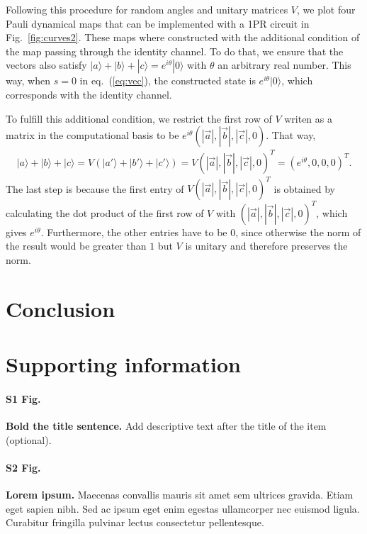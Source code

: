 \documentclass[10pt,letterpaper]{article} %
\newcommand{\fref}[1]{Fig.~\ref{#1}}
\newcommand{\eref}[1]{eq.~(\ref{#1})}
\begin{document}
Following this procedure for random
angles and unitary matrices $V$, 
we plot four Pauli dynamical maps 
that can be implemented with a 1PR circuit in \fref{fig:curves2}.
These maps where constructed with the additional condition
of the map passing through the identity channel.
To do that, we ensure that the vectors also satisfy
$|a\rangle + |b\rangle + |c\rangle = e^{i \theta}|0\rangle$ with $\theta$ an arbitrary
real number.
This way, when $s = 0$ in \eref{eq:vec}, the constructed state
is $e^{i \theta}|0\rangle$, which
corresponds with the identity channel.

To fulfill this additional condition,  we restrict the first row of
$V$ writen as a matrix in 
the computational basis to be $e^{i\theta} (|\vec{a}|, |\vec{b}|, |\vec{c}|,0)$. 
That way, 
\begin{align*}
|a\rangle + |b\rangle + |c\rangle = V (|a'\rangle + |b'\rangle + |c'\rangle ) = V(|\vec{a}|, |\vec{b}|, |\vec{c}|,0)^T = (e^{i\theta},0,0,0)^T.
\end{align*}
The last step is because the first entry of $V(|\vec{a}|, |\vec{b}|, |\vec{c}|,0)^T$
is obtained by calculating the dot product of the first row of $V$ with $(|\vec{a}|, |\vec{b}|, |\vec{c}|,0)^T$, which gives
$e^{i\theta}$. 
Furthermore, the other entries have to be $0$,
since otherwise the norm of the result would be greater than
$1$ but $V$ is unitary and therefore preserves the norm.




\section{Conclusion} %
\section{Supporting information} %

\paragraph*{S1 Fig.}
\label{S1_Fig}
{\bf Bold the title sentence.} Add descriptive text after the title of the item (optional).

\paragraph*{S2 Fig.}
\label{S2_Fig}
{\bf Lorem ipsum.} Maecenas convallis mauris sit amet sem ultrices gravida. Etiam eget sapien nibh. Sed ac ipsum eget enim egestas ullamcorper nec euismod ligula. Curabitur fringilla pulvinar lectus consectetur pellentesque.
\end{document}
